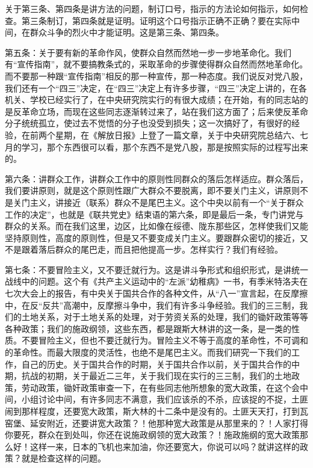 关于第三条、第四条是讲方法的问题，制订口号，指示的方法论如何指示，如何检查。第三条制订，第四条就是证明。证明这个口号指示正确不正确？要在实际中间，在群众斗争的烈火中才能证明。这是第三条、第四条。

第五条：关于要有新的革命作风，使群众自然而然地一步一步地革命化。我们有“宣传指南”，就不要搞教条式的，采取革命的步骤使得群众自然而然地革命化。而不要那一种跟“宣传指南”相反的那一种宣传，那一种态度。我们说反对党八股，我们还有一个“四三”决定，在“四三”决定上有许多步骤，“四三”决定上讲的，在各机关、学校已经实行了，在中央研究院实行的有很大成绩；在开始，有的同志站的是反革命立场，而现在这些同志逐渐转过来了，站在我们这方面了；后来使反革命分子统统孤立，使过去不觉悟的分子也没受到损失；这一次搞好了，有很好的经验，在前两个星期，在《解放日报》上登了一篇文章，关于中央研究院总结六、七月的学习，那个东西很可以看，那个东西不是党八股，那是按照实际的过程写出来的。

第六条：讲群众工作，讲群众工作中的原则性同群众的落后怎样适应。群众落后，我们要讲原则，就是这个原则性跟广大群众不要脱离，即不要关门主义，讲原则不是关门主义，讲接近（联系）群众不是尾巴主义。这个中央以前有一个“关于群众工作的决定”，也就是《联共党史》结束语的第六条，即是最后一条，专门讲党与群众的关系。而在我们这里，边区，比如像在绥德、陇东那些区，怎样使我们又能坚持原则性，高度的原则性，但是又不要变成关门主义。要跟群众密切的接近，又不是跟着落后群众的尾巴走，而且把他提高一步。怎样实行？我们有经验。

第七条：不要冒险主义，又不要迁就行为。这是讲斗争形式和组织形式，是讲统一战线中的问题。这个有《共产主义运动中的“左派”幼稚病》一书，有季米特洛夫在七次大会上的报告，有中央关于国共合作的各种文件，从“八一”宣言起，在反摩擦中，在反“反共”高潮中，反摩擦斗争中，我们有许多斗争经验。我们的三三制，我们的土地关系，对于土地关系的处理，对于劳资关系的处理，我们的锄奸政策等等各种政策；我们的施政纲领，这些东西，都是跟斯大林讲的这一条，是一类的性质。不要冒险主义，但也不要迁就行为。冒险主义不等于高度的革命性，不可调和的革命性。而最大限度的灵活性，也绝不是尾巴主义。而我们研究一下我们的工作，自己的历史。关于国共合作的时期，关于国共合作以前，关于国共合作的中期，抗战的初期，关于最近二三年，关于我们现在实行的三三制，我们的土地政策，劳动政策，锄奸政策审查一下，在有些同志他所想象的宽大政策，在这个会中间，小组讨论中间，有许多同志不满意，我们应该杀的不杀，应该捉的不捉，土匪闹到那样程度，还要宽大政策，斯大林的十二条中是没有的。土匪天天打，打到瓦窑堡、延安附近，还要讲宽大政策？！他那种宽大政策是从那里来的？！人家打得你要死，群众在到处叫，你还在说施政纲领的宽大政策？！施政施纲的宽大政策那么好！这样一来，日本的飞机也来加油，你还要宽大，你说可以吗？就讲这样的政策？就是检查这样的问题。


